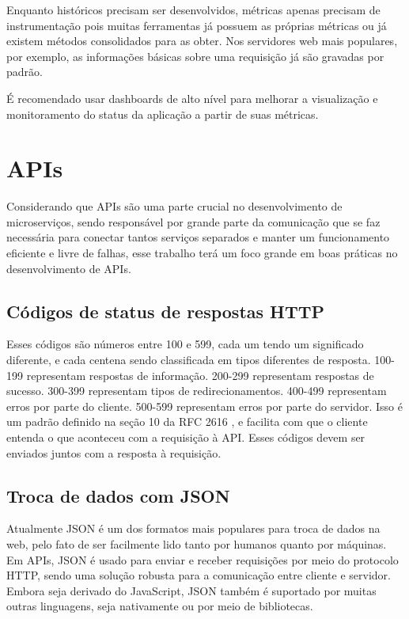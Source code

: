 Enquanto históricos precisam ser desenvolvidos, métricas apenas precisam de instrumentação pois muitas ferramentas já possuem as próprias métricas ou já existem métodos consolidados para as obter. Nos servidores web mais populares, por exemplo, as informações básicas sobre uma requisição já são gravadas por padrão.

É recomendado usar dashboards de alto nível para melhorar a visualização e monitoramento do status da aplicação a partir de suas métricas.

\section{APIs}\label{boas-praticas-apis}

Considerando que APIs são uma parte crucial no desenvolvimento de microserviços, sendo responsável por grande parte da comunicação que se faz necessária para conectar tantos serviços separados e manter um funcionamento eficiente e livre de falhas, esse trabalho terá um foco grande em boas práticas no desenvolvimento de APIs.

\subsection{Códigos de status de respostas HTTP}
Esses códigos são números entre 100 e 599, cada um tendo um significado diferente, e cada centena sendo classificada em tipos diferentes de resposta. 100-199 representam respostas de informação. 200-299 representam respostas de sucesso. 300-399 representam tipos de redirecionamentos. 400-499 representam erros por parte do cliente. 500-599 representam erros por parte do servidor. Isso é um padrão definido na seção 10 da RFC 2616 \cite{rfc_http_nielsen_1999}, e facilita com que o cliente entenda o que aconteceu com a requisição à API. Esses códigos devem ser enviados juntos com a resposta à requisição.

\subsection{Troca de dados com JSON}
Atualmente JSON é um dos formatos mais populares para troca de dados na web, pelo fato de ser facilmente lido tanto por humanos quanto por máquinas. Em APIs, JSON é usado para enviar e receber requisições por meio do protocolo HTTP, sendo uma solução robusta para a comunicação entre cliente e servidor. Embora seja derivado do JavaScript, JSON também é suportado por muitas outras linguagens, seja nativamente ou por meio de bibliotecas.  \cite{json_bourhis_2020}

